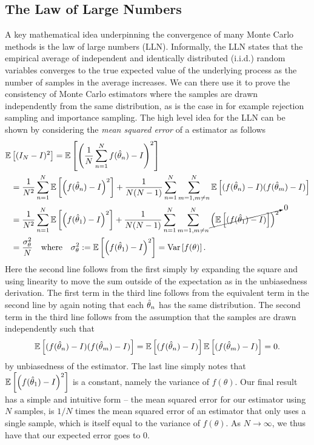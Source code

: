 \subsection{The Law of Large Numbers}
\label{sec:inf:mc:law}

A key mathematical idea underpinning the convergence of many Monte Carlo methods is the 
law of large numbers (LLN).  Informally, the LLN states that the empirical average of 
independent and identically distributed (i.i.d.)  random variables converges to 
the true expected value of the underlying process as the number of samples in the
average increases.  We can there use it to prove the consistency of Monte Carlo estimators
where the samples are drawn independently from the same distribution, as is the case
in for example rejection sampling and importance sampling.  The high level idea for the LLN can be shown by
considering the  \emph{mean squared error} of a \mc estimator as 
follows
\begin{align}
\mathbb{E} &\left[(I_N-I)^2\right] = \mathbb{E}\left[\left(\frac{1}{N}\sum_{n=1}^{N}f(\hat{\theta}_n) - I\right)^2\right] \nonumber \\
&= \frac{1}{N^2}\sum_{n=1}^{N} \mathbb{E}\left[ \left(f(\hat{\theta}_n)-I\right)^2\right] + 
\frac{1}{N(N-1)}\sum_{n=1}^{N}\sum_{m=1,m\neq n}^{N} \mathbb{E}\left[ (f(\hat{\theta}_n)-I)(f(\hat{\theta}_m)-I)\right] \nonumber \\
&= \frac{1}{N^2}\sum_{n=1}^{N} \mathbb{E}\left[ \left(f(\hat{\theta}_1)-I\right)^2\right] + 
\frac{1}{N(N-1)}\sum_{n=1}^{N}\sum_{m=1,m\neq n}^{N} \cancelto{0}{\left(\mathbb{E}\left[(f(\hat{\theta}_1)-I)\right]\right)^2} \nonumber \\
&= \frac{\sigma_{\theta}^2}{N}  \quad \text{where} \quad \sigma_{\theta}^2 := \mathbb{E}\left[ \left(f(\hat{\theta}_1)-I\right)^2\right]
= \mathrm{Var} \left[f(\theta)\right].\label{eq:inf:LLN-informal}
\end{align}
Here the second line follows from the first simply by expanding the square and using linearity
to move the sum outside of the expectation as in the unbiasedness derivation.
The first term in the third line follows from the equivalent term in the second line by again noting that
each $\hat{\theta}_n$ has the same distribution.  The second term in the third line
follows from the assumption that the samples are drawn independently such that
\[
\mathbb{E}\left[ (f(\hat{\theta}_n)-I)(f(\hat{\theta}_m)-I)\right] = \mathbb{E}\left[ (f(\hat{\theta}_n)-I)\right] \mathbb{E}\left[(f(\hat{\theta}_m)-I)\right]=0.
\]
by unbiasedness of the estimator. The last line simply notes that $\mathbb{E}\left[ \left(f(\hat{\theta}_1)-I\right)^2\right]$ is a constant,
namely the variance of $f(\theta)$.
  Our final result has a simple and intuitive form -- the mean squared error for
our estimator using $N$ samples, is $1/N$ times the mean squared error of an estimator that only uses
a single sample, which is itself equal to the variance of $f(\theta)$.  As $N\rightarrow\infty$, we thus
have that our expected error goes to $0$.

